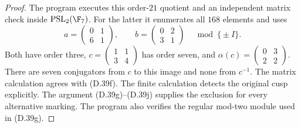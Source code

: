 \begin{proof}
The program
executes this order-$21$ quotient
and an independent matrix check
inside $\operatorname{PSL}_2(\F_7)$.
For the latter it enumerates all
$168$ elements and uses
\[
 a=\begin{pmatrix}0&1\\6&1\end{pmatrix},
 \qquad b=\begin{pmatrix}0&2\\3&1\end{pmatrix}
 \quad\bmod\{\pm I\}.
\]
Both have order three,
$c=\left(\begin{smallmatrix}1&1\\3&4\end{smallmatrix}\right)$
has order seven, and
$\alpha(c)=
\left(\begin{smallmatrix}0&3\\2&2\end{smallmatrix}\right)$.
There are seven conjugators from
$c$ to this image and none from
$c^{-1}$.  The matrix calculation
agrees with (D.39f).
The finite calculation detects the original
cusp explicitly.  The argument
(D.39g)--(D.39j) supplies the exclusion
for every alternative marking.
The program also verifies the regular
mod-two module used in (D.39g).
\end{proof}
